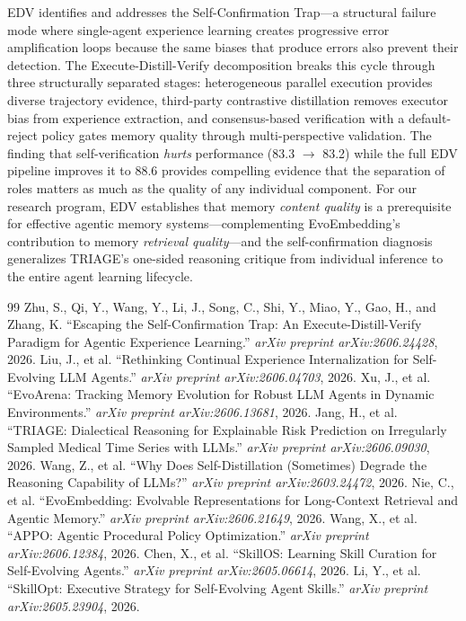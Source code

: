 \documentclass[11pt,a4paper]{article}
\begin{document}
EDV identifies and addresses the Self-Confirmation Trap---a structural failure mode where single-agent experience learning creates progressive error amplification loops because the same biases that produce errors also prevent their detection. The Execute-Distill-Verify decomposition breaks this cycle through three structurally separated stages: heterogeneous parallel execution provides diverse trajectory evidence, third-party contrastive distillation removes executor bias from experience extraction, and consensus-based verification with a default-reject policy gates memory quality through multi-perspective validation. The finding that self-verification \emph{hurts} performance (83.3 $\to$ 83.2) while the full EDV pipeline improves it to 88.6 provides compelling evidence that the separation of roles matters as much as the quality of any individual component. For our research program, EDV establishes that memory \emph{content quality} is a prerequisite for effective agentic memory systems---complementing EvoEmbedding's contribution to memory \emph{retrieval quality}---and the self-confirmation diagnosis generalizes TRIAGE's one-sided reasoning critique from individual inference to the entire agent learning lifecycle.

\begin{thebibliography}{99}
 Zhu, S., Qi, Y., Wang, Y., Li, J., Song, C., Shi, Y., Miao, Y., Gao, H., and Zhang, K. ``Escaping the Self-Confirmation Trap: An Execute-Distill-Verify Paradigm for Agentic Experience Learning.'' \emph{arXiv preprint arXiv:2606.24428}, 2026.
 Liu, J., et al. ``Rethinking Continual Experience Internalization for Self-Evolving LLM Agents.'' \emph{arXiv preprint arXiv:2606.04703}, 2026.
 Xu, J., et al. ``EvoArena: Tracking Memory Evolution for Robust LLM Agents in Dynamic Environments.'' \emph{arXiv preprint arXiv:2606.13681}, 2026.
 Jang, H., et al. ``TRIAGE: Dialectical Reasoning for Explainable Risk Prediction on Irregularly Sampled Medical Time Series with LLMs.'' \emph{arXiv preprint arXiv:2606.09030}, 2026.
 Wang, Z., et al. ``Why Does Self-Distillation (Sometimes) Degrade the Reasoning Capability of LLMs?'' \emph{arXiv preprint arXiv:2603.24472}, 2026.
 Nie, C., et al. ``EvoEmbedding: Evolvable Representations for Long-Context Retrieval and Agentic Memory.'' \emph{arXiv preprint arXiv:2606.21649}, 2026.
 Wang, X., et al. ``APPO: Agentic Procedural Policy Optimization.'' \emph{arXiv preprint arXiv:2606.12384}, 2026.
 Chen, X., et al. ``SkillOS: Learning Skill Curation for Self-Evolving Agents.'' \emph{arXiv preprint arXiv:2605.06614}, 2026.
 Li, Y., et al. ``SkillOpt: Executive Strategy for Self-Evolving Agent Skills.'' \emph{arXiv preprint arXiv:2605.23904}, 2026.
\end{thebibliography}
\end{document}
